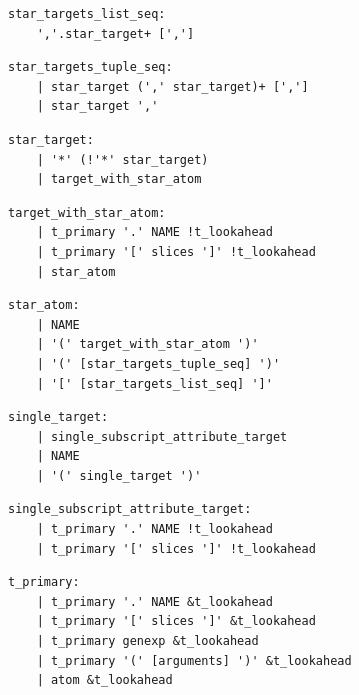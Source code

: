 \noindent\textbf{\texttt{}}\par
\begin{lstlisting}
star_targets_list_seq:
    ','.star_target+ [',']
\end{lstlisting}

\noindent\textbf{\texttt{}}\par
\begin{lstlisting}
star_targets_tuple_seq:
    | star_target (',' star_target)+ [',']
    | star_target ','
\end{lstlisting}

\noindent\textbf{\texttt{}}\par
\begin{lstlisting}
star_target:
    | '*' (!'*' star_target)
    | target_with_star_atom
\end{lstlisting}

\noindent\textbf{\texttt{}}\par
\begin{lstlisting}
target_with_star_atom:
    | t_primary '.' NAME !t_lookahead
    | t_primary '[' slices ']' !t_lookahead
    | star_atom
\end{lstlisting}

\noindent\textbf{\texttt{}}\par
\begin{lstlisting}
star_atom:
    | NAME
    | '(' target_with_star_atom ')'
    | '(' [star_targets_tuple_seq] ')'
    | '[' [star_targets_list_seq] ']'
\end{lstlisting}

\noindent\textbf{\texttt{}}\par
\begin{lstlisting}
single_target:
    | single_subscript_attribute_target
    | NAME
    | '(' single_target ')'
\end{lstlisting}

\noindent\textbf{\texttt{}}\par
\begin{lstlisting}
single_subscript_attribute_target:
    | t_primary '.' NAME !t_lookahead
    | t_primary '[' slices ']' !t_lookahead
\end{lstlisting}

\noindent\textbf{\texttt{}}\par
\begin{lstlisting}
t_primary:
    | t_primary '.' NAME &t_lookahead
    | t_primary '[' slices ']' &t_lookahead
    | t_primary genexp &t_lookahead
    | t_primary '(' [arguments] ')' &t_lookahead
    | atom &t_lookahead
\end{lstlisting}

